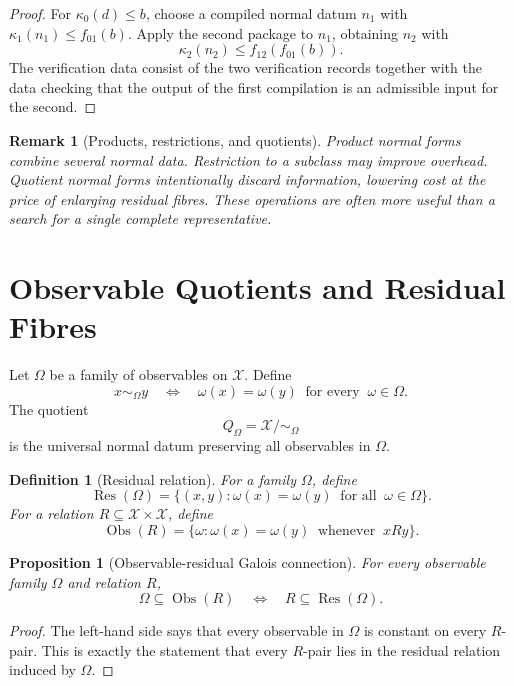 \documentclass[11pt]{article}
\newtheorem{proposition}[theorem]{Proposition}
\newtheorem{definition}[theorem]{Definition}
\newtheorem{remark}[theorem]{Remark}
\DeclareMathOperator{\Obs}{Obs}
\DeclareMathOperator{\Res}{Res}
\begin{document}
\begin{proof}
For \(\kappa_0(d)\leq b\), choose a compiled normal datum \(n_1\) with \(\kappa_1(n_1)\leq f_{01}(b)\). Apply the second package to \(n_1\), obtaining \(n_2\) with
\[
\kappa_2(n_2)\leq f_{12}(f_{01}(b)).
\]
The verification data consist of the two verification records together with the data checking that the output of the first compilation is an admissible input for the second.
\end{proof}

\begin{remark}[Products, restrictions, and quotients]
Product normal forms combine several normal data. Restriction to a subclass may improve overhead. Quotient normal forms intentionally discard information, lowering cost at the price of enlarging residual fibres. These operations are often more useful than a search for a single complete representative.
\end{remark}

\section{Observable Quotients and Residual Fibres}

Let \(\Omega\) be a family of observables on \(\mathcal X\). Define
\[
x\sim_\Omega y
\quad\Longleftrightarrow\quad
\omega(x)=\omega(y)\ \text{ for every }\ \omega\in\Omega.
\]
The quotient
\[
Q_\Omega=\mathcal X/{\sim_\Omega}
\]
is the universal normal datum preserving all observables in \(\Omega\).

\begin{definition}[Residual relation]
For a family \(\Omega\), define
\[
\Res(\Omega)=
\{(x,y):\omega(x)=\omega(y)\ \text{ for all }\ \omega\in\Omega\}.
\]
For a relation \(R\subseteq\mathcal X\times\mathcal X\), define
\[
\Obs(R)=
\{\omega:\omega(x)=\omega(y)\ \text{ whenever }\ xRy\}.
\]
\end{definition}

\begin{proposition}[Observable-residual Galois connection]
For every observable family \(\Omega\) and relation \(R\),
\[
\Omega\subseteq \Obs(R)
\quad\Longleftrightarrow\quad
R\subseteq \Res(\Omega).
\]
\end{proposition}

\begin{proof}
The left-hand side says that every observable in \(\Omega\) is constant on every \(R\)-pair. This is exactly the statement that every \(R\)-pair lies in the residual relation induced by \(\Omega\).
\end{proof}
\end{document}
